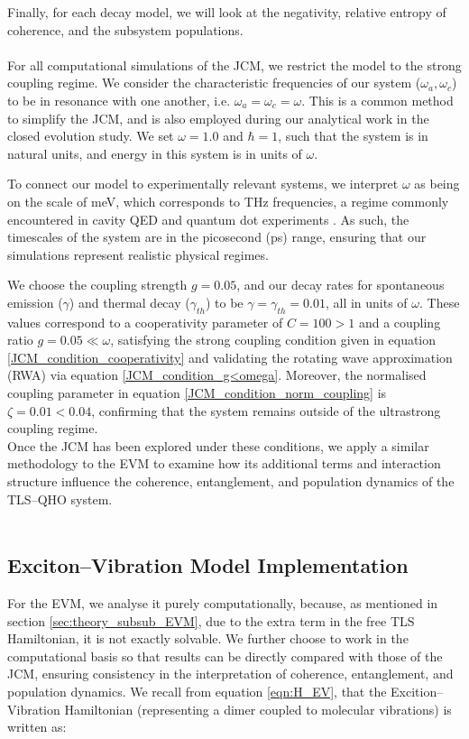 \documentclass[11pt]{article}
\begin{document}
Finally, for each decay model, we will look at the negativity, relative entropy of coherence, and the subsystem populations.\\
\\
For all computational simulations of the JCM, we restrict the model to the strong coupling regime. We consider the characteristic frequencies of our system ($\omega_a, \omega_c$) to be in resonance with one another, i.e. $\omega_a = \omega_c = \omega$. This is a common method to simplify the JCM, and is also employed during our analytical work in the closed evolution study. We set $\omega = 1.0$ and $\hbar = 1$, such that the system is in natural units, and energy in this system is in units of $\omega$. 

To connect our model to experimentally relevant systems, we interpret $\omega$ as being on the scale of meV, which corresponds to THz frequencies, a regime commonly encountered in cavity QED and quantum dot experiments \cite{General2024-JCM_relevance}. As such, the timescales of the system are in the picosecond (ps) range, ensuring that our simulations represent realistic physical regimes.

We choose the coupling strength $g = 0.05$, and our decay rates for spontaneous emission ($\gamma$) and thermal decay ($\gamma_{\scriptscriptstyle th}$) to be $\gamma = \gamma_{\scriptscriptstyle th} = 0.01$, all in units of $\omega$. These values correspond to a cooperativity parameter of $C = 100 > 1$ and a coupling ratio $g = 0.05 \ll \omega$, satisfying the strong coupling condition given in equation \eqref{JCM_condition_cooperativity} and validating the rotating wave approximation (RWA) via equation \eqref{JCM_condition_g<omega}. Moreover, the normalised coupling parameter in equation \eqref{JCM_condition_norm_coupling} is $\zeta = 0.01 < 0.04$, confirming that the system remains outside of the ultrastrong coupling regime.\\
Once the JCM has been explored under these conditions, we apply a similar methodology to the EVM to examine how its additional terms and interaction structure influence the coherence, entanglement, and population dynamics of the TLS--QHO system. \\
\\
\subsection{Exciton--Vibration Model Implementation} \label{sec:method_sub_EVM}
For the EVM, we analyse it purely computationally, because, as mentioned in section \ref{sec:theory_subsub_EVM}, due to the extra term in the free TLS Hamiltonian, it is not exactly solvable. We further choose to work in the computational basis so that results can be directly compared with those of the JCM, ensuring consistency in the interpretation of coherence, entanglement, and population dynamics. We recall from equation \eqref{eqn:H_EV}, that the Excition--Vibration Hamiltonian (representing a dimer coupled to molecular vibrations) is written as:
\end{document}
